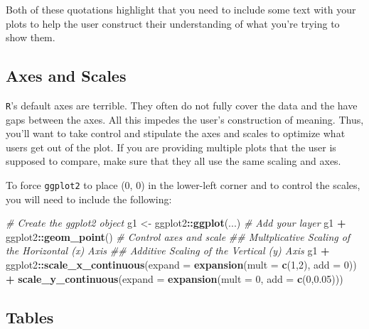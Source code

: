 \documentclass[
]{book}
\newenvironment{Shaded}{\begin{snugshade}}{\end{snugshade}}
\newcommand{\CommentTok}[1]{\textcolor[rgb]{0.56,0.35,0.01}{\textit{#1}}}
\newcommand{\DataTypeTok}[1]{\textcolor[rgb]{0.13,0.29,0.53}{#1}}
\newcommand{\DecValTok}[1]{\textcolor[rgb]{0.00,0.00,0.81}{#1}}
\newcommand{\FloatTok}[1]{\textcolor[rgb]{0.00,0.00,0.81}{#1}}
\newcommand{\KeywordTok}[1]{\textcolor[rgb]{0.13,0.29,0.53}{\textbf{#1}}}
\newcommand{\NormalTok}[1]{#1}
\newcommand{\OperatorTok}[1]{\textcolor[rgb]{0.81,0.36,0.00}{\textbf{#1}}}
\newcommand{\StringTok}[1]{\textcolor[rgb]{0.31,0.60,0.02}{#1}}
\begin{document}
Both of these quotations highlight that you need to include some text with your plots to help the user construct their understanding of what you're trying to show them.

\hypertarget{axes-and-scales}{%
\subsection{Axes and Scales}\label{axes-and-scales}}

\texttt{R}'s default axes are terrible. They often do not fully cover the data and the have gaps between the axes. All this impedes the user's construction of meaning. Thus, you'll want to take control and stipulate the axes and scales to optimize what users get out of the plot. If you are providing multiple plots that the user is supposed to compare, make sure that they all use the same scaling and axes.

To force \texttt{ggplot2} to place (0, 0) in the lower-left corner and to control the scales, you will need to include the following:

\begin{Shaded}
\begin{Highlighting}[]
\CommentTok{# Create the ggplot2 object}
\NormalTok{g1 <-}\StringTok{ }\NormalTok{ggplot2}\OperatorTok{::}\KeywordTok{ggplot}\NormalTok{(...)}
\CommentTok{# Add your layer}
\NormalTok{g1 }\OperatorTok{+}\StringTok{ }\NormalTok{ggplot2}\OperatorTok{::}\KeywordTok{geom_point}\NormalTok{()}
\CommentTok{# Control axes and scale}
\CommentTok{## Multplicative Scaling of the Horizontal (x) Axis}
\CommentTok{## Additive Scaling of the Vertical (y) Axis}
\NormalTok{g1 }\OperatorTok{+}\StringTok{ }\NormalTok{ggplot2}\OperatorTok{::}\KeywordTok{scale_x_continuous}\NormalTok{(}\DataTypeTok{expand =} \KeywordTok{expansion}\NormalTok{(}\DataTypeTok{mult =} \KeywordTok{c}\NormalTok{(}\DecValTok{1}\NormalTok{,}\DecValTok{2}\NormalTok{), }\DataTypeTok{add =} \DecValTok{0}\NormalTok{)) }\OperatorTok{+}\StringTok{ }
\StringTok{  }\KeywordTok{scale_y_continuous}\NormalTok{(}\DataTypeTok{expand =} \KeywordTok{expansion}\NormalTok{(}\DataTypeTok{mult =} \DecValTok{0}\NormalTok{, }\DataTypeTok{add =} \KeywordTok{c}\NormalTok{(}\DecValTok{0}\NormalTok{,}\FloatTok{0.05}\NormalTok{))) }
\end{Highlighting}
\end{Shaded}

\hypertarget{tables}{%
\subsection{Tables}\label{tables}}
\end{document}
